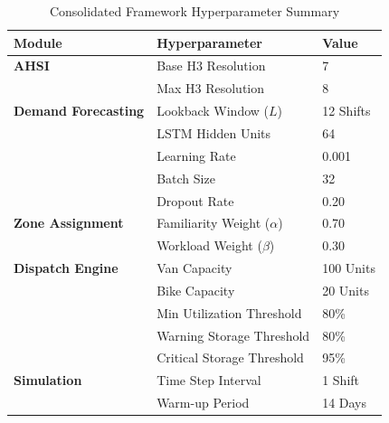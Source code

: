 \documentclass{article}
\begin{document}
\begin{table}[htbp]
\centering
\caption{Consolidated Framework Hyperparameter Summary}
\label{tab:hyperparameter_summary}
\begin{tabular}{lll}
\hline
\textbf{Module} & \textbf{Hyperparameter} & \textbf{Value} \\ \hline
\textbf{AHSI} & Base H3 Resolution & 7 \\
 & Max H3 Resolution & 8 \\
\textbf{Demand Forecasting} & Lookback Window ($L$) & 12 Shifts \\
 & LSTM Hidden Units & 64 \\
 & Learning Rate & 0.001 \\
 & Batch Size & 32 \\
 & Dropout Rate & 0.20 \\ \hline
\textbf{Zone Assignment} & Familiarity Weight ($\alpha$) & 0.70 \\
 & Workload Weight ($\beta$) & 0.30 \\ \hline
\textbf{Dispatch Engine} & Van Capacity & 100 Units \\
 & Bike Capacity & 20 Units \\
 & Min Utilization Threshold & 80\% \\
 & Warning Storage Threshold & 80\% \\
 & Critical Storage Threshold & 95\% \\ \hline
\textbf{Simulation} & Time Step Interval & 1 Shift \\
 & Warm-up Period & 14 Days \\ \hline
\end{tabular}
\end{table}
\end{document}
